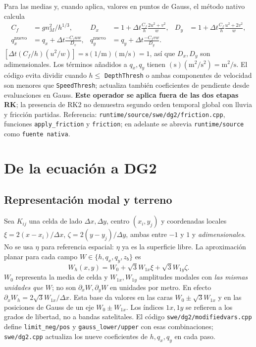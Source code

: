 \documentclass[11pt,a4paper]{article}
\newcommand{\src}[1]{\nolinkurl{#1}}
\newcommand{\unit}[1]{\mathrm{#1}}
\begin{document}
Para las medias y, cuando aplica, valores en puntos de Gauss, el método nativo calcula
\begin{align}
 C_f&=gn_M^2/h^{1/3}, & D_x&=1+\Delta t\frac{C_f}{h}\frac{2u^2+v^2}{w},
 & D_y&=1+\Delta t\frac{C_f}{h}\frac{u^2+2v^2}{w},\label{eq:fricden}\\
 q_x^{\mathrm{nuevo}}&=q_x+\Delta t\frac{-C_fuw}{D_x}, &
 q_y^{\mathrm{nuevo}}&=q_y+\Delta t\frac{-C_fvw}{D_y}.\label{eq:fricdisc}
\end{align}
$[\Delta t(C_f/h)(u^2/w)]=\unit s(1/\unit m)(\unit{m/s})=1$, así que $D_x,D_y$ son adimensionales. Los términos añadidos a $q_x,q_y$ tienen $(\unit s)(\unit{m^2/s^2})=\unit{m^2/s}$. El código evita dividir cuando $h\leq$ \texttt{DepthThresh} o ambas componentes de velocidad son menores que \texttt{SpeedThresh}; actualiza también coeficientes de pendiente desde evaluaciones en Gauss. \textbf{Este operador se aplica fuera de las dos etapas RK}; la presencia de RK2 no demuestra segundo orden temporal global con lluvia y fricción partidas. Referencia: \src{runtime/source/swe/dg2/friction.cpp}, funciones \texttt{apply\_friction} y \texttt{friction}; en adelante se abrevia \texttt{runtime/source} como \texttt{fuente nativa}.

\section{De la ecuación a DG2}
\label{sec:dg2}
\subsection{Representación modal y terreno}
Sea $K_{ij}$ una celda de lado $\Delta x,\Delta y$, centro $(x_i,y_j)$ y coordenadas locales $\xi=2(x-x_i)/\Delta x$, $\zeta=2(y-y_j)/\Delta y$, ambas entre $-1$ y $1$ y \emph{adimensionales}. No se usa $\eta$ para referencia espacial: $\eta$ ya es la superficie libre. La aproximación planar para cada campo $W\in\{h,q_x,q_y,z_b\}$ es
\begin{equation}
 W_h(x,y)=W_0+\sqrt3 W_{1x}\xi+\sqrt3 W_{1y}\zeta.\label{eq:basis}
\end{equation}
$W_0$ representa la media de celda y $W_{1x},W_{1y}$ amplitudes modales con \emph{las mismas unidades que $W$}; no son $\partial_xW,\partial_yW$ en unidades por metro. En efecto $\partial_xW_h=2\sqrt3W_{1x}/\Delta x$. Esta base da valores en las caras $W_0\pm\sqrt3W_{1x}$ y en las posiciones de Gauss de un eje $W_0\pm W_{1x}$. Los índices $1x,1y$ se refieren a los grados de libertad, no a bandas satelitales. El código \src{swe/dg2/modifiedvars.cpp} define \texttt{limit\_neg/pos} y \texttt{gauss\_lower/upper} con esas combinaciones; \src{swe/dg2.cpp} actualiza los nueve coeficientes de $h,q_x,q_y$ en cada paso.
\end{document}
